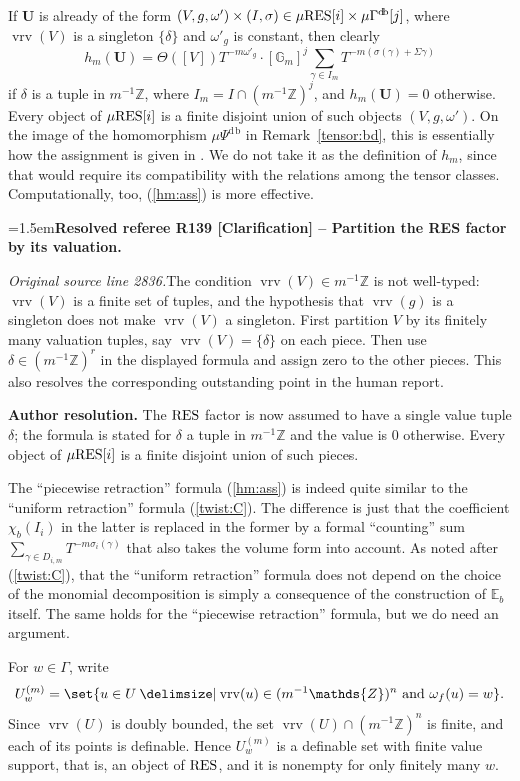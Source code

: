 \documentclass[12pt]{amsart}
\newcommand{\ResolvedRefereeRemark}[5]{%
  \par\medskip\begingroup\normalfont\small\color{gray}%
  \emergencystretch=1.5em\noindent\textbf{Resolved referee R#1 [#2] -- #3.}\par\nobreak\noindent #4\par
  \medskip\color{ResolutionGreen}\noindent\textbf{Author resolution.} #5\par
  \endgroup\medskip
}
\theoremstyle{plain}
\theoremstyle{definition}
\theoremstyle{remark}
\numberwithin{equation}{section}
\theoremstyle{plain}
\newcommand{\Z}{\mathds{Z}}
\newcommand{\G}{\mathds{G}}
\newcommand{\0}{\emptyset}
\newcommand{\bb}[1]{\mathbb{#1}}
\providecommand\given{}
\newcommand\SetSymbol[1][]{%
\nonscript \: #1 \vert
\allowbreak
\nonscript\:
\mathopen{}}
\renewcommand\given{\SetSymbol[\delimsize]}
\newcommand{\mG}{{\mu}{\Gamma}}
\newcommand{\RES}{\textup{RES}}
\newcommand{\mgRES}{{\mu}{\RES}}
\DeclareMathOperator{\vrv}{vrv}
\DeclareMathOperator{\db}{d \! b}
\begin{document}
If $\bm U$ is already of the form $(V, g, \omega') \times (I, \sigma) \in \mgRES[i] \times \mG^{\db}[j]$, where $\vrv(V)$ is a singleton $\{\delta\}$ and $\omega'_g$ is constant, then clearly
\[
h_m(\bm U) = \Theta([V])T^{-m\omega'_g} \cdot [\G_m]^{j} \sum_{\gamma \in I_{m}} T^{-m (\sigma(\gamma) + \Sigma \gamma )}
\]
if $\delta$ is a tuple in $m^{-1}\Z$, where $I_m = I \cap (m^{-1}\Z)^j$, and $h_m(\bm U) = 0$ otherwise. Every object of $\mgRES[i]$ is a finite disjoint union of such objects $(V, g, \omega')$. On the image of the homomorphism ${\mu} \Psi^{\db}$ in Remark~\ref{tensor:bd}, this is essentially how the assignment is given in \cite[\S~8.2]{hru:loe:lef}. We do not take it as the definition of $h_m$, since that would require its compatibility with the relations among the tensor classes. Computationally, too,  (\ref{hm:ass}) is more effective.

\ResolvedRefereeRemark{139}{Clarification}{Partition the RES factor by its valuation}{%
\textit{Original source line 2836.}\quad The condition $\vrv(V)\in m^{-1}\Z$ is not well-typed: $\vrv(V)$ is a finite set of tuples, and the hypothesis that $\vrv(g)$ is a singleton does not make $\vrv(V)$ a singleton. First partition $V$ by its finitely many valuation tuples, say $\vrv(V)=\{\delta\}$ on each piece. Then use $\delta\in(m^{-1}\Z)^r$ in the displayed formula and assign zero to the other pieces. This also resolves the corresponding outstanding point in the human report.
}{The $\RES$ factor is now assumed to have a single value tuple $\delta$; the formula is stated for $\delta$ a tuple in $m^{-1}\Z$ and the value is $0$ otherwise. Every object of $\mgRES[i]$ is a finite disjoint union of such pieces.}


The ``piecewise retraction'' formula (\ref{hm:ass}) is indeed quite similar to the ``uniform retraction'' formula (\ref{twist:C}). The difference is just that the coefficient $\chi_b(I_i)$ in the latter is replaced in the former by a formal ``counting'' sum $\sum_{\gamma \in D_{i,m}} T^{-m \sigma_i(\gamma)}$ that also takes the volume form into account. As noted after (\ref{twist:C}), that the ``uniform retraction'' formula does not depend on the choice of the monomial decomposition is simply a consequence of the construction of $\bb E_b$ itself. The same holds for the ``piecewise retraction'' formula, but we do need an argument.

For $w \in \Gamma$, write
\[
U^{(m)}_w = \set{u \in U \given \vrv(u) \in (m^{-1}\Z)^n \text{ and } \omega_f(u) = w}.
\]
Since $\vrv(U)$ is doubly bounded, the set $\vrv(U) \cap (m^{-1}\Z)^n$ is finite, and each of its points is definable. Hence $U^{(m)}_w$ is a definable set with finite value support, that is, an object of $\RES$, and it is nonempty for only finitely many $w$.
\end{document}
